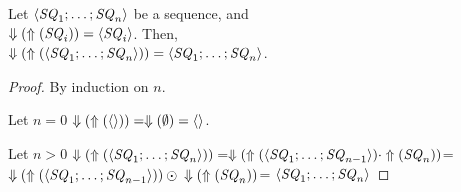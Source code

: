 \documentclass[numbers]{sigplanconf}
\begin{document}
\begin{lemma}
  \label{lem:dnf-rx}
  Let $\langle\mathit{SQ}_1;\ldots;\mathit{SQ}_n\rangle$ be a sequence,
  and\\ $\Downarrow(\Uparrow(\mathit{SQ}_i))=\langle\mathit{SQ}_i\rangle$.
  Then,\\ $\Downarrow(\Uparrow(\langle\mathit{SQ}_1;\ldots;\mathit{SQ}_n\rangle))=
  \langle\mathit{SQ}_1;\ldots;\mathit{SQ}_n\rangle$.
\end{lemma}
\begin{proof}

  By induction on $n$.

  Let $n=0$
  $\Downarrow(\Uparrow(\langle\rangle))=\Downarrow(\emptyset)=\langle\rangle$.

  Let $n>0$
  $\Downarrow(\Uparrow(\langle\mathit{SQ}_1;\ldots;\mathit{SQ}_n\rangle))=
  \Downarrow(\Uparrow(\langle\mathit{SQ}_1;\ldots;\mathit{SQ}_{n-1}\rangle)
  \cdot\Uparrow(\mathit{SQ}_n))$=
  $\Downarrow(\Uparrow(\langle\mathit{SQ}_1;\ldots;\mathit{SQ}_{n-1}\rangle))
  \odot\\\Downarrow(\Uparrow(\mathit{SQ}_n))$=
  $\langle\mathit{SQ}_1;\ldots;\mathit{SQ}_n\rangle$
\end{proof}
\end{document}
